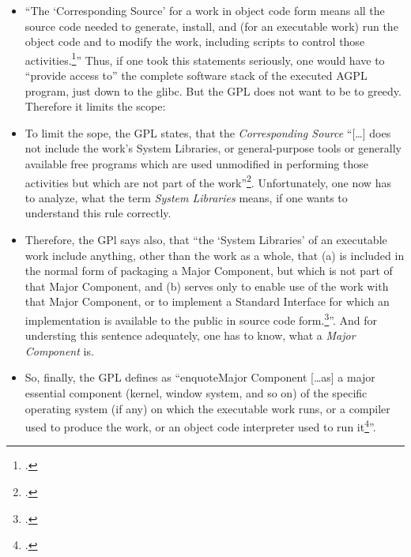 \begin{itemize}
  \item  \enquote{The \enquote{Corresponding Source} for a work in object code
  form means all the source code needed to generate, install, and (for an
  executable work) run the object code and to modify the work, including scripts
  to control those activities.\footcite[cf.][\nopage wp.
  §1]{Gpl30OsiLicense2007a}} Thus, if one took this statements seriously, one
  would have to \enquote{provide access to} the complete software stack of the
  executed AGPL program, just down to the glibc. But the GPL does not want to
  be to greedy. Therefore it limits the scope:
  \item To limit the sope, the GPL states, that the \emph{Corresponding Source}
  \enquote{[\ldots] does not include the work's System Libraries, or
  general-purpose tools or generally available free programs which are used
  unmodified in performing those activities but which are not part of the
  work}\footcite[cf.][\nopage wp. §1]{Gpl30OsiLicense2007a}. Unfortunately, one
  now has to analyze, what the term \emph{System Libraries} means, if one wants
  to understand this rule correctly.
  \item Therefore, the GPl says also, that \enquote{the \enquote{System
  Libraries} of an executable work include anything, other than the work as a
  whole, that (a) is included in the normal form of packaging a Major Component,
  but which is not part of that Major Component, and (b) serves only to enable
  use of the work with that Major Component, or to implement a Standard
  Interface for which an implementation is available to the public in source
  code form.\footcite[cf.][\nopage wp. §1]{Gpl30OsiLicense2007a}}. And for
  understing this sentence adequately, one has to know, what a \emph{Major Component}
  is.
  \item So, finally, the GPL defines as \enquote{enquote{Major Component}
  [\ldots as] a major essential component (kernel, window system, and so on) of
  the specific operating system (if any) on which the executable work runs, or a
  compiler used to produce the work, or an object code interpreter used to run
  it\footcite[cf.][\nopage wp. §1]{Gpl30OsiLicense2007a}}.
\end{itemize}

